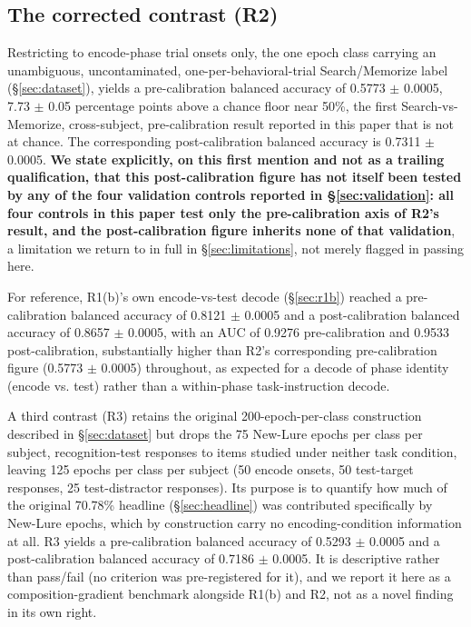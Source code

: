 \documentclass[preprint,12pt]{elsarticle}
\begin{document}
\subsection{The corrected contrast (R2)}\label{sec:r2}

Restricting to encode-phase trial onsets only, the one epoch class carrying an unambiguous, uncontaminated, one-per-behavioral-trial Search/Memorize label (\S\ref{sec:dataset}), yields a pre-calibration balanced accuracy of 0.5773 $\pm$ 0.0005, 7.73 $\pm$ 0.05 percentage points above a chance floor near 50\%, the first Search-vs-Memorize, cross-subject, pre-calibration result reported in this paper that is not at chance. The corresponding post-calibration balanced accuracy is 0.7311 $\pm$ 0.0005. \textbf{We state explicitly, on this first mention and not as a trailing qualification, that this post-calibration figure has not itself been tested by any of the four validation controls reported in \S\ref{sec:validation}: all four controls in this paper test only the pre-calibration axis of R2's result, and the post-calibration figure inherits none of that validation}, a limitation we return to in full in \S\ref{sec:limitations}, not merely flagged in passing here.

For reference, R1(b)'s own encode-vs-test decode (\S\ref{sec:r1b}) reached a pre-calibration balanced accuracy of 0.8121 $\pm$ 0.0005 and a post-calibration balanced accuracy of 0.8657 $\pm$ 0.0005, with an AUC of 0.9276 pre-calibration and 0.9533 post-calibration, substantially higher than R2's corresponding pre-calibration figure (0.5773 $\pm$ 0.0005) throughout, as expected for a decode of phase identity (encode vs. test) rather than a within-phase task-instruction decode.

A third contrast (R3) retains the original 200-epoch-per-class construction described in \S\ref{sec:dataset} but drops the 75 New-Lure epochs per class per subject, recognition-test responses to items studied under neither task condition, leaving 125 epochs per class per subject (50 encode onsets, 50 test-target responses, 25 test-distractor responses). Its purpose is to quantify how much of the original 70.78\% headline (\S\ref{sec:headline}) was contributed specifically by New-Lure epochs, which by construction carry no encoding-condition information at all. R3 yields a pre-calibration balanced accuracy of 0.5293 $\pm$ 0.0005 and a post-calibration balanced accuracy of 0.7186 $\pm$ 0.0005. It is descriptive rather than pass/fail (no criterion was pre-registered for it), and we report it here as a composition-gradient benchmark alongside R1(b) and R2, not as a novel finding in its own right.
\end{document}
